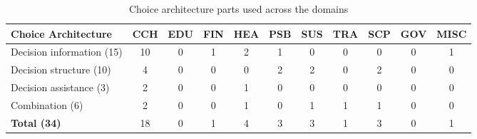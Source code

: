 \begin{table}[htbp]
\centering
\small
\begin{tabular}{p{3.5cm}|cccccccccc}
\textbf{Choice Architecture} & \textbf{CCH} & \textbf{EDU} & \textbf{FIN} & \textbf{HEA} & \textbf{PSB} & \textbf{SUS} & \textbf{TRA} & \textbf{SCP} & \textbf{GOV} & \textbf{MISC} \\ \hline
Decision information (15) & 10 & 0 & 1 & 2 & 1 & 0 & 0 & 0 & 0 & 1 \\
Decision structure (10) & 4 & 0 & 0 & 0 & 2 & 2 & 0 & 2 & 0 & 0 \\
Decision assistance (3) & 2 & 0 & 0 & 1 & 0 & 0 & 0 & 0 & 0 & 0 \\
Combination (6) & 2 & 0 & 0 & 1 & 0 & 1 & 1 & 1 & 0 & 0 \\ \hline
\textbf{Total (34)} & 18 & 0 & 1 & 4 & 3 & 3 & 1 & 3 & 0 & 1
\end{tabular}
\caption{Choice architecture parts used across the domains}
\label{tabel:choice-arch-domains}
\end{table}

